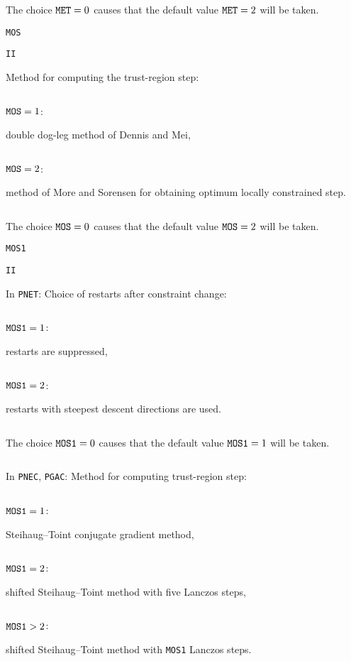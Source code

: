 \documentclass{esub2acm}
\begin{document}
\noindent\parbox{30mm}{$\;$}\parbox[t]{125mm}{The choice ${\tt MET}=0$
  causes that the default value ${\tt MET}=2$ will be taken.}
  \par\vspace{2mm}
\noindent\parbox{20mm}{\tt MOS}\parbox{10mm}{\tt II}\parbox[t]{125mm}{
  Method for computing the trust-region step:}
  \par\vspace{1mm}
\noindent\parbox{30mm}{$\;$}\parbox{24mm}{${\tt MOS}=1$:}\parbox[t]{101mm}{
  double dog-leg method of Dennis and Mei,}
  \par
\noindent\parbox{30mm}{$\;$}\parbox{24mm}{${\tt MOS}=2$:}\parbox[t]{101mm}{
  method of More and Sorensen for obtaining optimum locally constrained step.}
  \par\vspace{1mm}
\noindent\parbox{30mm}{$\;$}\parbox[t]{125mm}{The choice ${\tt MOS}=0$
  causes that the default value ${\tt MOS}=2$ will be taken.}
  \par\vspace{2mm}
\noindent\parbox{20mm}{\tt MOS1}\parbox{10mm}{\tt II}\parbox[t]{125mm}{
  In {\tt PNET}: Choice of restarts after constraint change:}
  \par\vspace{1mm}
\noindent\parbox{30mm}{$\;$}\parbox{24mm}{${\tt MOS1}=1$:}\parbox[t]{101mm}{
  restarts are suppressed,}
  \par
\noindent\parbox{30mm}{$\;$}\parbox{24mm}{${\tt MOS1}=2$:}\parbox[t]{101mm}{
  restarts with steepest descent directions are used.}
  \par\vspace{1mm}
\noindent\parbox{30mm}{$\;$}\parbox[t]{125mm}{The choice ${\tt MOS1}=0$
  causes that the default value ${\tt MOS1}=1$ will be taken.}
  \par\vspace{1mm}
\noindent \parbox{30mm}{$\;$}\parbox[t]{125mm}{In {\tt PNEC}, {\tt PGAC}:
  Method for computing trust-region step:}
  \par\vspace{1mm}
\noindent\parbox{30mm}{$\;$}\parbox{24mm}{${\tt MOS1}=1$:}\parbox[t]{101mm}{
  Steihaug--Toint conjugate gradient method,}
  \par
\noindent\parbox{30mm}{$\;$}\parbox{24mm}{${\tt MOS1}=2$:}\parbox[t]{101mm}{
  shifted Steihaug--Toint method with five Lanczos steps,}
  \par
\noindent\parbox{30mm}{$\;$}\parbox{24mm}{${\tt MOS1}>2$:}\parbox[t]{101mm}{
  shifted Steihaug--Toint method with {\tt MOS1} Lanczos steps.}
\end{document}
